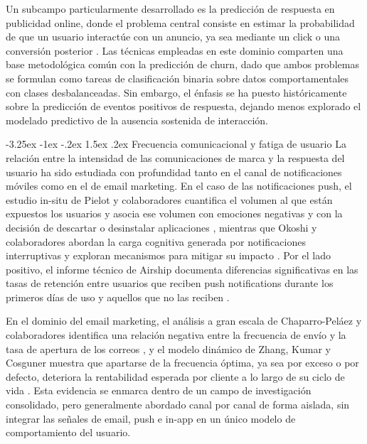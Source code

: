 \documentclass[11pt,a4paper]{article}
\makeatletter
\renewcommand\subsection{\@startsection{subsection}{2}{\z@}%
  {-3.25ex \@plus -1ex \@minus -.2ex}%
  {1.5ex \@plus .2ex}%
  {\normalfont\normalsize\itshape}}
\makeatother
\begin{document}
Un subcampo particularmente desarrollado es la predicción de respuesta en publicidad online, donde el problema central consiste en estimar la probabilidad de que un usuario interactúe con un anuncio, ya sea mediante un click o una conversión posterior \cite{gharibshah2022user}. Las técnicas empleadas en este dominio comparten una base metodológica común con la predicción de churn, dado que ambos problemas se formulan como tareas de clasificación binaria sobre datos comportamentales con clases desbalanceadas. Sin embargo, el énfasis se ha puesto históricamente sobre la predicción de eventos positivos de respuesta, dejando menos explorado el modelado predictivo de la ausencia sostenida de interacción.
 
\subsection{Frecuencia comunicacional y fatiga de usuario}
La relación entre la intensidad de las comunicaciones de marca y la respuesta del usuario ha sido estudiada con profundidad tanto en el canal de notificaciones móviles como en el de email marketing. En el caso de las notificaciones push, el estudio in-situ de Pielot y colaboradores cuantifica el volumen al que están expuestos los usuarios y asocia ese volumen con emociones negativas y con la decisión de descartar o desinstalar aplicaciones \cite{pielot2014insitu}, mientras que Okoshi y colaboradores abordan la carga cognitiva generada por notificaciones interruptivas y exploran mecanismos para mitigar su impacto \cite{okoshi2015attelia}. Por el lado positivo, el informe técnico de Airship documenta diferencias significativas en las tasas de retención entre usuarios que reciben push notifications durante los primeros días de uso y aquellos que no las reciben \cite{airship2018push}.
 
En el dominio del email marketing, el análisis a gran escala de Chaparro-Peláez y colaboradores identifica una relación negativa entre la frecuencia de envío y la tasa de apertura de los correos \cite{chaparropelaez2022attention}, y el modelo dinámico de Zhang, Kumar y Cosguner muestra que apartarse de la frecuencia óptima, ya sea por exceso o por defecto, deteriora la rentabilidad esperada por cliente a lo largo de su ciclo de vida \cite{zhang2017dynamically}. Esta evidencia se enmarca dentro de un campo de investigación consolidado, pero generalmente abordado canal por canal de forma aislada, sin integrar las señales de email, push e in-app en un único modelo de comportamiento del usuario.
 
\end{document}
